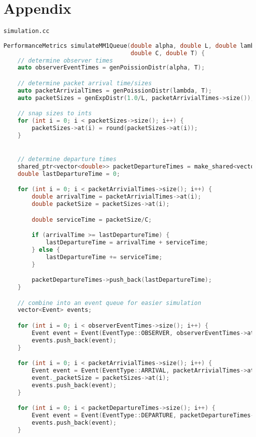 \documentclass{article}
\begin{document}
\newpage
\section{Appendix}

\texttt{simulation.cc}
\begin{lstlisting}[language=C++,
                   directivestyle={\color{black}}
                   emph={int,char,double,float,unsigned},
                   emphstyle={\color{blue}}
                  ]
PerformanceMetrics simulateMM1Queue(double alpha, double L, double lambda,
                                    double C, double T) {
    // determine observer times
    auto observerEventTimes = genPoissionDistr(alpha, T);

    // determine packet arrival time/sizes
    auto packetArrivialTimes = genPoissionDistr(lambda, T);
    auto packetSizes = genExpDistr(1.0/L, packetArrivialTimes->size());

    // snap sizes to ints
    for (int i = 0; i < packetSizes->size(); i++) {
        packetSizes->at(i) = round(packetSizes->at(i));
    }


    // determine departure times
    shared_ptr<vector<double>> packetDepartureTimes = make_shared<vector<double>>();
    double lastDepartureTime = 0;

    for (int i = 0; i < packetArrivialTimes->size(); i++) {
        double arrivalTime = packetArrivialTimes->at(i);
        double packetSize = packetSizes->at(i);

        double serviceTime = packetSize/C;

        if (arrivalTime >= lastDepartureTime) {
            lastDepartureTime = arrivalTime + serviceTime;
        } else {
            lastDepartureTime += serviceTime;
        }

        packetDepartureTimes->push_back(lastDepartureTime);
    }

    // combine into an event queue for easier simulation
    vector<Event> events;

    for (int i = 0; i < observerEventTimes->size(); i++) {
        Event event = Event(EventType::OBSERVER, observerEventTimes->at(i));
        events.push_back(event);
    }

    for (int i = 0; i < packetArrivialTimes->size(); i++) {
        Event event = Event(EventType::ARRIVAL, packetArrivialTimes->at(i));
        event._packetSize = packetSizes->at(i);
        events.push_back(event);
    }

    for (int i = 0; i < packetDepartureTimes->size(); i++) {
        Event event = Event(EventType::DEPARTURE, packetDepartureTimes->at(i));
        events.push_back(event);
    }


\end{lstlisting}
\end{document}

